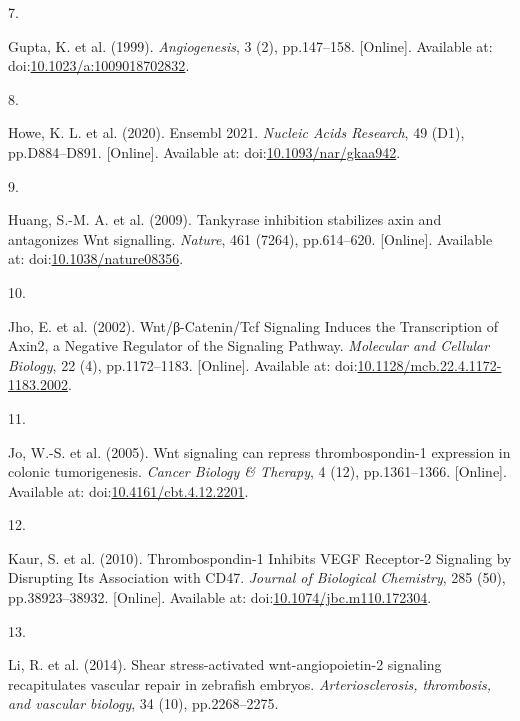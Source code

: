 \documentclass[
  11pt,
]{article}
\newlength{\cslhangindent}
\newlength{\csllabelwidth}
\newlength{\cslentryspacingunit} %
\newenvironment{CSLReferences}[2] %
 {%
  \setlength{\parindent}{0pt}
  \ifodd #1
  \let\oldpar\par
  \def\par{\hangindent=\cslhangindent\oldpar}
  \fi
  \setlength{\parskip}{#2\cslentryspacingunit}
 }%
 {}
\newcommand{\CSLLeftMargin}[1]{\parbox[t]{\csllabelwidth}{#1}}
\newcommand{\CSLRightInline}[1]{\parbox[t]{\linewidth - \csllabelwidth}{#1}\break}
\begin{document}
\begin{CSLReferences}{0}{0}
\leavevmode{}%
\CSLLeftMargin{7. }
\CSLRightInline{Gupta, K. {et al.} (1999). \emph{Angiogenesis}, 3 (2), pp.147--158. {[}Online{]}. Available at: doi:\href{https://doi.org/10.1023/a:1009018702832}{10.1023/a:1009018702832}.}

\leavevmode{}%
\CSLLeftMargin{8. }
\CSLRightInline{Howe, K. L. {et al.} (2020). {Ensembl 2021}. \emph{Nucleic Acids Research}, 49 (D1), pp.D884--D891. {[}Online{]}. Available at: doi:\href{https://doi.org/10.1093/nar/gkaa942}{10.1093/nar/gkaa942}.}

\leavevmode{}%
\CSLLeftMargin{9. }
\CSLRightInline{Huang, S.-M. A. {et al.} (2009). {Tankyrase inhibition stabilizes axin and antagonizes Wnt signalling}. \emph{Nature}, 461 (7264), pp.614--620. {[}Online{]}. Available at: doi:\href{https://doi.org/10.1038/nature08356}{10.1038/nature08356}.}

\leavevmode{}%
\CSLLeftMargin{10. }
\CSLRightInline{Jho, E. {et al.} (2002). {Wnt/β-Catenin/Tcf Signaling Induces the Transcription of Axin2, a Negative Regulator of the Signaling Pathway}. \emph{Molecular and Cellular Biology}, 22 (4), pp.1172--1183. {[}Online{]}. Available at: doi:\href{https://doi.org/10.1128/mcb.22.4.1172-1183.2002}{10.1128/mcb.22.4.1172-1183.2002}.}

\leavevmode{}%
\CSLLeftMargin{11. }
\CSLRightInline{Jo, W.-S. {et al.} (2005). {Wnt signaling can repress thrombospondin-1 expression in colonic tumorigenesis}. \emph{Cancer Biology \& Therapy}, 4 (12), pp.1361--1366. {[}Online{]}. Available at: doi:\href{https://doi.org/10.4161/cbt.4.12.2201}{10.4161/cbt.4.12.2201}.}

\leavevmode{}%
\CSLLeftMargin{12. }
\CSLRightInline{Kaur, S. {et al.} (2010). {Thrombospondin-1 Inhibits VEGF Receptor-2 Signaling by Disrupting Its Association with CD47}. \emph{Journal of Biological Chemistry}, 285 (50), pp.38923--38932. {[}Online{]}. Available at: doi:\href{https://doi.org/10.1074/jbc.m110.172304}{10.1074/jbc.m110.172304}.}

\leavevmode{}%
\CSLLeftMargin{13. }
\CSLRightInline{Li, R. {et al.} (2014). {Shear stress-activated wnt-angiopoietin-2 signaling recapitulates vascular repair in zebrafish embryos}. \emph{Arteriosclerosis, thrombosis, and vascular biology}, 34 (10), pp.2268--2275.}


\end{CSLReferences}
\end{document}
